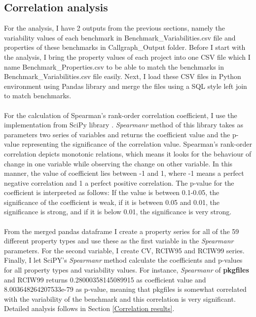\documentclass{seal_thesis}
\begin{document}
\subsection{Correlation analysis}
\label{Correlation analysis}
For the analysis, I have 2 outputs from the previous sections, namely the variability values of each benchmark in Benchmark\_Variabilities.csv file and properties of these benchmarks in Callgraph\_Output folder. Before I start with the analysis, I bring the property values of each project into one CSV file which I name Benchmark\_Properties.csv to be able to match the benchmarks in Benchmark\_Variabilities.csv file easily. Next, I load these CSV files in Python environment using Pandas library \cite{Pandas} and merge the files using a SQL style left join to match benchmarks.\\
\\
For the calculation of Spearman's rank-order correlation coefficient, I use the implementation from SciPy library \cite{ScipySpearmanr}. \textit{Spearmanr} method of this library takes as parameters two series of variables and returns the coefficient value and the p-value representing the significance of the correlation value. Spearman's rank-order correlation depicts monotonic relations, which means it looks for the behaviour of change in one variable while observing the change on other variable. In this manner, the value of coefficient lies between -1 and 1, where -1 means a perfect negative correlation and 1 a perfect positive correlation. The p-value for the coefficient is interpreted as follows: If the value is between 0.1-0.05, the significance of the coefficient is weak, if it is between 0.05 and 0.01, the significance is strong, and if it is below 0.01, the significance is very strong. \\
\\
From the merged pandas dataframe I create a property series for all of the 59 different property types and use these as the first variable in the \textit{Spearmanr} parameters. For the second variable, I create CV, RCIW95 and RCIW99 series. Finally, I let SciPY's \textit{Spearmanr} method calculate the coefficients and p-values for all property types and variability values. For instance, \textit{Spearmanr} of \textbf{pkgfiles} and RCIW99 returns 0.28000358145089915 as coefficient value and 8.003648264207533e-79 as p-value, meaning that pkgfiles is somewhat correlated with the variability of the benchmark and this correlation is very significant. Detailed analysis follows in Section \ref{Correlation results}.
\end{document}

